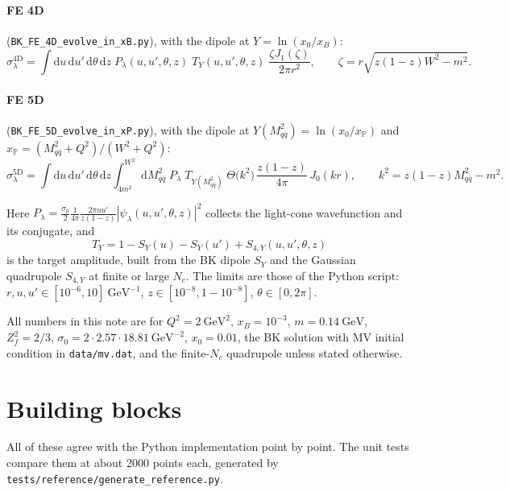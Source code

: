 \documentclass[11pt,a4paper]{article}
\newcommand{\Mqq}{M_{q\bar q}^2}
\newcommand{\dd}{\mathrm{d}}
\newcommand{\xP}{x_{\mathbb{P}}}
\newcommand{\code}[1]{\texttt{#1}}
\begin{document}
\paragraph{FE 4D} (\code{BK\_FE\_4D\_evolve\_in\_xB.py}), with the dipole at
$Y = \ln(x_0/x_B)$:
\begin{equation}
  \sigma_\lambda^{\text{4D}}
  = \int \dd u \, \dd u' \, \dd\theta \, \dd z \;
    P_\lambda(u, u', \theta, z) \; T_Y(u, u', \theta, z) \;
    \frac{\zeta J_1(\zeta)}{2\pi r^2} ,
  \qquad
  \zeta = r \sqrt{z(1-z) W^2 - m^2} .
  \label{eq:fe4d}
\end{equation}

\paragraph{FE 5D} (\code{BK\_FE\_5D\_evolve\_in\_xP.py}), with the dipole at
$Y(\Mqq) = \ln(x_0/\xP)$ and $\xP = (\Mqq + Q^2)/(W^2 + Q^2)$:
\begin{equation}
  \sigma_\lambda^{\text{5D}}
  = \int \dd u \, \dd u' \, \dd\theta \, \dd z
    \int_{4m^2}^{W^2} \dd\Mqq \;
    P_\lambda \; T_{Y(\Mqq)} \;
    \Theta\big(k^2\big) \, \frac{z(1-z)}{4\pi} \, J_0(k r) ,
  \qquad
  k^2 = z(1-z)\Mqq - m^2 .
  \label{eq:fe5d}
\end{equation}

Here $P_\lambda = \frac{\sigma_0}{2} \frac{1}{4\pi}
\frac{2\pi u u'}{z(1-z)} |\psi_\lambda(u, u', \theta, z)|^2$ collects the
light-cone wavefunction and its conjugate, and
\begin{equation}
  T_Y = 1 - S_Y(u) - S_Y(u') + S_{4,Y}(u, u', \theta, z)
\end{equation}
is the target amplitude, built from the BK dipole $S_Y$ and the Gaussian
quadrupole $S_{4,Y}$ at finite or large $N_c$. The limits are those of the
Python script: $r, u, u' \in [10^{-6}, 10]\ \text{GeV}^{-1}$,
$z \in [10^{-8}, 1 - 10^{-8}]$, $\theta \in [0, 2\pi]$.

All numbers in this note are for $Q^2 = 2\ \text{GeV}^2$, $x_B = 10^{-3}$,
$m = 0.14\ \text{GeV}$, $Z_f^2 = 2/3$, $\sigma_0 = 2 \cdot 2.57 \cdot 18.81\
\text{GeV}^{-2}$, $x_0 = 0.01$, the BK solution with MV initial condition in
\code{data/mv.dat}, and the finite-$N_c$ quadrupole unless stated otherwise.

\section{Building blocks}

All of these agree with the Python implementation point by point. The unit tests
compare them at about 2000 points each, generated by
\code{tests/reference/generate\_reference.py}.
\end{document}
